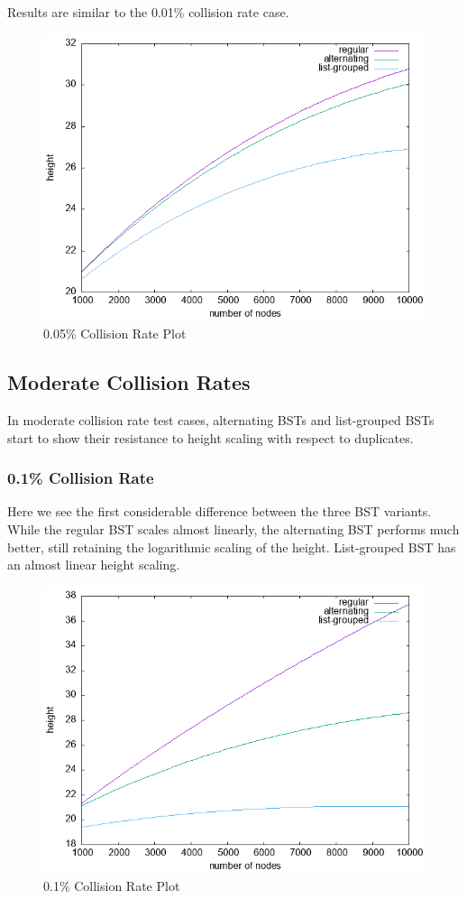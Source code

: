 \documentclass[fleqn,10pt]{SelfArx} %
\begin{document}
Results are similar to the 0.01\% collision rate case.
\begin{figure}[ht]
	\includegraphics[width=\linewidth]{Figures/0.05_plot.png}
	\caption{0.05\% Collision Rate Plot}
	\label{fig:0.05_plot}
\end{figure}

\subsection{Moderate Collision Rates}
In moderate collision rate test cases, alternating BSTs and list-grouped BSTs start to show their resistance to height scaling with respect to duplicates.
\subsubsection{0.1\% Collision Rate}
Here we see the first considerable difference between the three BST variants. While the regular BST scales almost linearly, the alternating BST performs much better, still retaining the logarithmic scaling of the height. List-grouped BST has an almost linear height scaling. 

\begin{figure}[ht]\centering
	\includegraphics[width=\linewidth]{Figures/0.1_plot.png}
	\caption{0.1\% Collision Rate Plot}
	\label{fig:0.1_plot}
\end{figure}
\end{document}
